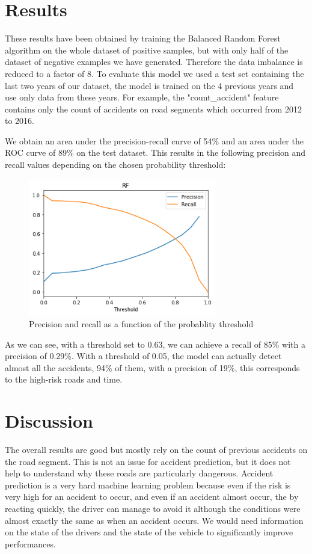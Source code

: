 \documentclass[conference]{IEEEtran}
\begin{document}
\section{Results}
These results have been obtained by training the Balanced Random Forest algorithm on the whole dataset of positive samples, but with only half of the dataset of negative examples we have generated. Therefore the data imbalance is reduced to a factor of 8. To evaluate this model we used a test set containing the last two years of our dataset, the model is trained on the 4 previous years and use only data from these years. For example, the "count\_accident" feature contains only the count of accidents on road segments which occurred from 2012 to 2016.

We obtain an area under the precision-recall curve of 54\% and an area under the ROC curve of 89\% on the test dataset.
This results in the following precision and recall values depending on the chosen probability threshold:

\begin{figure}[htbp]
\centerline{\includegraphics[height=6cm, keepaspectratio]{figures/pr.png}}
\caption{Precision and recall as a function of the probablity threshold}
\label{fig}
\end{figure}

As we can see, with a threshold set to 0.63, we can achieve a recall of 85\% with a precision of 0.29\%. With a threshold of 0.05, the model can actually detect almost all the accidents, 94\% of them, with a precision of 19\%, this corresponds to the high-risk roads and time.

\section{Discussion}
The overall results are good but mostly rely on the count of previous accidents on the road segment. This is not an issue for accident prediction, but it does not help to understand why these roads are particularly dangerous. Accident prediction is a very hard machine learning problem because even if the risk is very high for an accident to occur, and even if an accident almost occur, the by reacting quickly, the driver can manage to avoid it although the conditions were almost exactly the same as when an accident occurs. We would need information on the state of the drivers and the state of the vehicle to significantly improve performances. 
\end{document}

